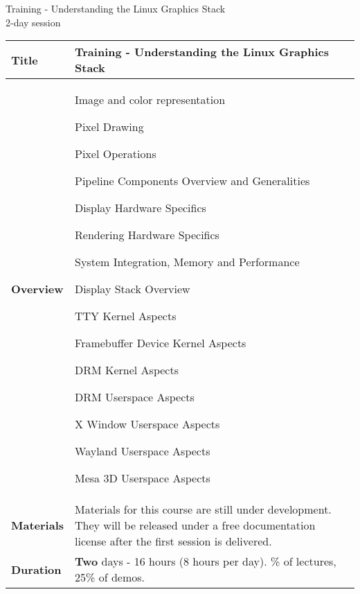 \documentclass[a4paper,12pt,obeyspaces,spaces,hyphens]{article}
\begin{document}
\thispagestyle{fancy}

\setlength{\arrayrulewidth}{0.8pt}

\begin{center}
\LARGE
Training - Understanding the Linux Graphics Stack\\
\large
2-day session
\end{center}

\vspace{1cm}
\small
{}

 {
  \begin{tabularx}{\textwidth}{|g|h|}
    {\bf Title} & {\bf Training - Understanding the Linux Graphics Stack} \\
    \hline

    {\bf Overview} &
    Image and color representation \par
    Pixel Drawing \par
    Pixel Operations \par
    Pipeline Components Overview and Generalities \par
    Display Hardware Specifics \par
    Rendering Hardware Specifics \par
    System Integration, Memory and Performance \par
    Display Stack Overview \par
    TTY Kernel Aspects \par
    Framebuffer Device Kernel Aspects \par
    DRM Kernel Aspects \par
    DRM Userspace Aspects \par
    X Window Userspace Aspects \par
    Wayland Userspace Aspects \par
    Mesa 3D Userspace Aspects\\
    \hline
    {\bf Materials} &
     Materials for this course are still under development.
     They will be released under a free documentation license
     after the first session is delivered.\\
    \hline

    {\bf Duration} & {\bf Two} days - 16 hours (8 hours per day).
    \% of lectures, 25\% of demos. \\
    \hline


\end{tabularx}}
\end{document}
